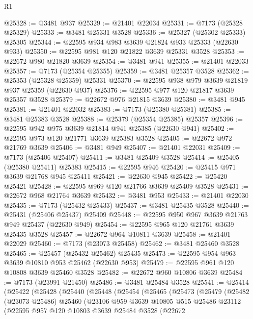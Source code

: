 \begin{lexlean}{R1}
\begin{coremodule}
@25328 := @3481 @937
@25329 := @21401 @22034
@25331 := @7173 (@25328 @25329)
@25333 := @3481 @25331 @3528
@25336 := @25327 (@25302 @25333) @25305
@25344 := @22595 @934 @983 @3639 @21824 @933 @25333 (@22630 @933)
@25350 := @22595 @981 @120 @21822 @3639 @25331 @3528
@25353 := @22672 @980 @21820 @3639
@25354 := @3481 @941
@25355 := @21401 @22033
@25357 := @7173 (@25354 @25355)
@25359 := @3481 @25357 @3528
@25362 := @25353 (@25328 @25359) @25331
@25370 := @22595 @938 @979 @3639 @21819 @937 @25359 (@22630 @937)
@25376 := @22595 @977 @120 @21817 @3639 @25357 @3528
@25379 := @22672 @976 @21815 @3639
@25380 := @3481 @945
@25381 := @21401 @22032
@25383 := @7173 (@25380 @25381)
@25385 := @3481 @25383 @3528
@25388 := @25379 (@25354 @25385) @25357
@25396 := @22595 @942 @975 @3639 @21814 @941 @25385 (@22630 @941)
@25402 := @22595 @973 @120 @21771 @3639 @25383 @3528
@25405 := @22672 @972 @21769 @3639
@25406 := @3481 @949
@25407 := @21401 @22031
@25409 := @7173 (@25406 @25407)
@25411 := @3481 @25409 @3528
@25414 := @25405 (@25380 @25411) @25383
@25415 := @22595 @946
@25420 := @25415 @971 @3639 @21768 @945 @25411
@25421 := @22630 @945
@25422 := @25420 @25421
@25428 := @22595 @969 @120 @21766 @3639 @25409 @3528
@25431 := @22672 @968 @21764 @3639
@25432 := @3481 @953
@25433 := @21401 @22030
@25435 := @7173 (@25432 @25433)
@25437 := @3481 @25435 @3528
@25440 := @25431 (@25406 @25437) @25409
@25448 := @22595 @950 @967 @3639 @21763 @949 @25437 (@22630 @949)
@25454 := @22595 @965 @120 @21761 @3639 @25435 @3528
@25457 := @22672 @964 @10811 @3639
@25458 := @21401 @22029
@25460 := @7173 (@23073 @25458)
@25462 := @3481 @25460 @3528
@25465 := @25457 (@25432 @25462) @25435
@25473 := @22595 @954 @963 @3639 @10810 @953 @25462 (@22630 @953)
@25479 := @22595 @961 @120 @10808 @3639 @25460 @3528
@25482 := @22672 @960 @10806 @3639
@25484 := @7173 (@23991 @21450)
@25486 := @3481 @25484 @3528
@25541 := @25414
    (@25422
      (@25428
        (@25440
          (@25448
            (@25454
              (@25465
                (@25473
                  (@25479
                    (@25482
                      (@23073 @25486)
                      @25460
                      (@23106
                        @959
                        @3639
                        @10805
                        @515
                        @25486
                        @23112
                        (@22595
                          @957
                          @120
                          @10803
                          @3639
                          @25484
                          @3528
                          (@22672

\end{coremodule}
\end{lexlean}

